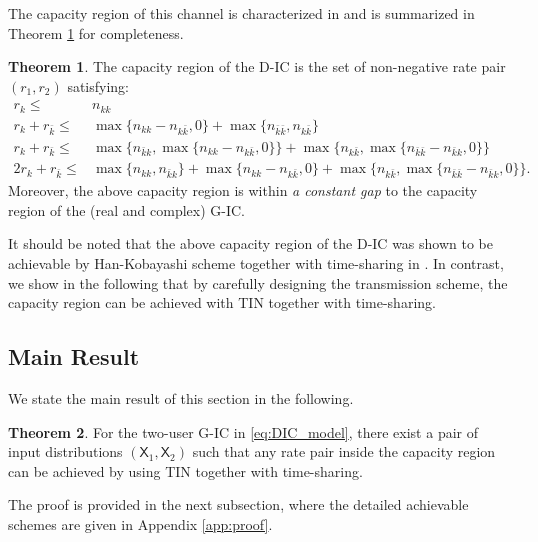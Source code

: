 \documentclass[12pt, draftclsnofoot, onecolumn]{IEEEtran}
\newcommand{\msf}[1]{\mathsf{#1}}
\theoremstyle{definition}
\newtheorem{theorem}{Theorem}
\begin{document}
The capacity region of this channel is characterized in \cite{doi:10.1002/ett.1287} and is summarized in Theorem \ref{the:1} for completeness.
\begin{theorem} \label{the:1}
The capacity region of the D-IC is the set of non-negative rate pair $(r_1,r_2)$ satisfying:
\begin{align}
r_k\leq& n_{kk} \label{eq:dmodcap1} \\
r_k+r_{\bar{k}} \leq &\max\{n_{kk}-n_{k\bar{k}},0\}+\max\{n_{\bar{k}\bar{k}},n_{k\bar{k}}\} \label{eq:dmodcap2}\\
r_k+r_{\bar{k}} \leq& \max\{n_{\bar{k}k},\max\{n_{kk}-n_{k\bar{k}},0\}\} %
+\max\{n_{k\bar{k}},\max\{n_{\bar{k}\bar{k}}-n_{\bar{k}k},0\}\} \label{eq:dmodcap4}\\
2r_k+r_{\bar{k}} \leq &\max\{n_{kk},n_{\bar{k}k}\}+\max\{n_{kk}-n_{k\bar{k}},0\} %
+\max\{n_{k\bar{k}},\max\{n_{\bar{k}\bar{k}}-n_{\bar{k}k},0\}\} \label{eq:dmodcap5}.
\end{align}
Moreover, the above capacity region is within \emph{a constant gap} to the capacity region of the (real and complex) G-IC.
\end{theorem}

It should be noted that the above capacity region of the D-IC was shown to be achievable by Han-Kobayashi scheme together with time-sharing in \cite{doi:10.1002/ett.1287}. In contrast, we show in the following that by carefully designing the transmission scheme, the capacity region can be achieved with TIN together with time-sharing.




\subsection{Main Result}
We state the main result of this section in the following.
\begin{theorem}\label{the:main}
For the two-user G-IC in \eqref{eq:DIC_model}, there exist a pair of input distributions $(\msf{X}_1,\msf{X}_2)$ such that any rate pair inside the capacity region can be achieved by using TIN together with time-sharing.
\end{theorem}
\begin{IEEEproof}
The proof is provided in the next subsection, where the detailed achievable schemes are given in Appendix \ref{app:proof}.
\end{IEEEproof}
\end{document}
